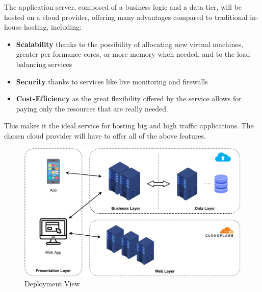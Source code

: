 The application server, composed of a business logic and a data tier, will be hosted on a cloud provider, offering many advantages compared to traditional in-house hosting, including:
\begin{itemize}
    \item \textbf{Scalability} thanks to the possibility of allocating new virtual machines, greater per formance cores, or more memory when needed, and to the load balancing services
    \item \textbf{Security} thanks to services like live monitoring and firewalls
    \item \textbf{Cost-Efficiency} as the great flexibility offered by the service allows for paying only the resources that are really needed.
\end{itemize}
This makes it the ideal service for hosting big and high traffic applications. The chosen cloud provider will have to offer all of the above features.

\begin{figure}[H]
    \includegraphics[width=\linewidth]{images/draw.io/deployment.pdf}
    \caption{Deployment View}
    \label{fig:deployment_view}
\end{figure}


